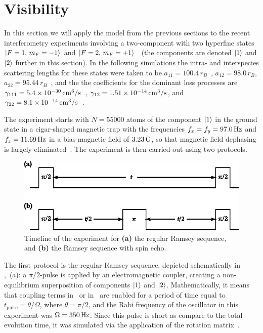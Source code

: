 \section{Visibility}

In this section we will apply the model from the previous sections to the recent interferometry experiments involving a two-component \Rb{}  with two hyperfine states ${\mbox{\ensuremath{\left\vert F=1,\, m_F=-1 \right\rangle}}}$ and ${\mbox{\ensuremath{\left\vert F=2,\, m_F=+1 \right\rangle}}}$~\cite{Egorov2011} (the components are denoted $\mbox{\ensuremath{\left\vert 1 \right\rangle}}$ and $\mbox{\ensuremath{\left\vert 2 \right\rangle}}$ further in this section).
In the following simulations the intra- and interspecies scattering lengths for these states were taken to be $a_{11} = 100.4\,r_B$~\cite{Widera2006,Mertes2007}, $a_{12} = 98.0\,r_B$, $a_{22} = 95.44\,r_B$~\cite{Egorov2013}, and the the coefficients for the dominant loss processes are $\gamma_{111} = 5.4 \times 10^{-30} \mbox{\ensuremath{\,\mathrm{cm^6/s}}}$~\cite{Mertes2007}, $\gamma_{12} = 1.51 \times 10^{-14}\mbox{\ensuremath{\,\mathrm{cm^3/s}}}$, and $\gamma_{22} = 8.1 \times 10^{-14} \mbox{\ensuremath{\,\mathrm{cm^3/s}}}$~\cite{Egorov2013}.

The experiment starts with $N = 55000$ atoms of the component $\mbox{\ensuremath{\left\vert 1 \right\rangle}}$ in the ground state in a cigar-shaped magnetic trap with the frequencies $f_x = f_y = 97.0\mbox{\ensuremath{\,\mathrm{Hz}}}$ and $f_z = 11.69\mbox{\ensuremath{\,\mathrm{Hz}}}$ in a bias magnetic field of $3.23\mbox{\ensuremath{\,\mathrm{G}}}$, so that magnetic field dephasing is largely eliminated~\cite{Hall1998}.
The experiment is then carried out using two protocols.

\begin{figure}
    \centerline{\includegraphics{figures_precreated/sequences.eps}}
    \caption{
    Timeline of the experiment for \textbf{(a)} the regular Ramsey sequence, and \textbf{(b)} the Ramsey sequence with spin echo.}%
    \label{fig:bec-noise:visibility:sequences}
\end{figure}

The first protocol is the regular Ramsey sequence, depicted schematically in ,~(a): a $\pi/2$-pulse is applied by an electromagnetic coupler, creating a non-equilibrium superposition of components $\mbox{\ensuremath{\left\vert 1 \right\rangle}}$ and $\mbox{\ensuremath{\left\vert 2 \right\rangle}}$.
Mathematically, it means that coupling terms in~ or in~ are enabled for a period of time equal to $t_{\mathrm{pulse}} = \theta / \Omega$, where $\theta = \pi/2$, and the Rabi frequency of the oscillator in this experiment was $\Omega = 350\mbox{\ensuremath{\,\mathrm{Hz}}}$.
Since this pulse is short as compare to the total evolution time, it was simulated via the application of the rotation matrix~.


